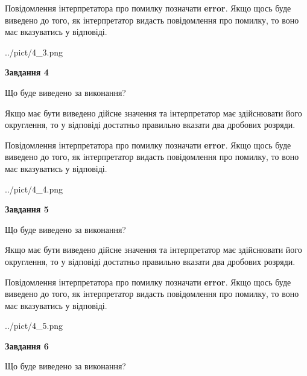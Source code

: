 \documentclass[12pt, ukrainian]{article}
\begin{document}
{\begin {Large}
Повідомлення інтерпретатора про помилку позначати \textbf{error}.
Якщо щось буде виведено до того, як інтерпретатор видасть повідомлення про помилку, 
то воно має вказуватись у відповіді. \par

\begin{center}
	{../pict/4_3.png}
\end{center}
\newpage

{\begin {center}\textbf{Завдання 4}\end {center}}\par
Що буде виведено за виконання? \par

Якщо має бути виведено дійсне значення та інтерпретатор має здійснювати його округлення, 
то у відповіді достатньо правильно вказати два дробових розряди.

Повідомлення інтерпретатора про помилку позначати \textbf{error}.
Якщо щось буде виведено до того, як інтерпретатор видасть повідомлення про помилку, 
то воно має вказуватись у відповіді. \par

\begin{center}
	{../pict/4_4.png}
\end{center}
\newpage

{\begin {center}\textbf{Завдання 5}\end {center}}\par
Що буде виведено за виконання? \par

Якщо має бути виведено дійсне значення та інтерпретатор має здійснювати його округлення, 
то у відповіді достатньо правильно вказати два дробових розряди.

Повідомлення інтерпретатора про помилку позначати \textbf{error}.
Якщо щось буде виведено до того, як інтерпретатор видасть повідомлення про помилку, 
то воно має вказуватись у відповіді. \par

\begin{center}
	{../pict/4_5.png}
\end{center}
\newpage

{\begin {center}\textbf{Завдання 6}\end {center}}\par
Що буде виведено за виконання? \par


\end{Large}}
\end{document}
